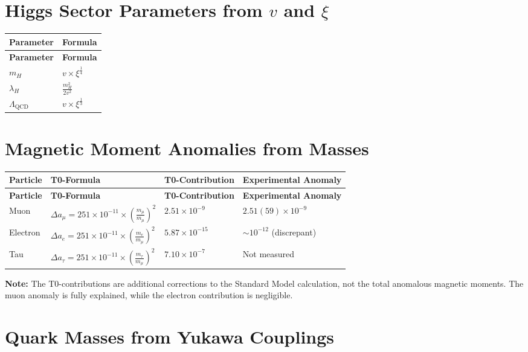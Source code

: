 \documentclass[12pt,a4paper]{article}
\begin{document}
	\section{Higgs Sector Parameters from $v$ and $\xi$}
	\begin{longtable}{|p{5cm}|p{6cm}|}
		\hline
		\textbf{Parameter} & \textbf{Formula} \\
		\hline
		\endfirsthead
		\hline
		\textbf{Parameter} & \textbf{Formula} \\
		\hline
		\endhead
		$m_H$ & $v \times \xi^{\frac{1}{4}}$ \\
		\hline
		$\lambda_H$ & $\frac{m_H^{2}}{2v^{2}}$ \\
		\hline
		$\Lambda_{\text{QCD}}$ & $v \times \xi^{\frac{1}{3}}$ \\
		\hline
	\end{longtable}
	
	\section{Magnetic Moment Anomalies from Masses}
	\begin{longtable}{|p{3cm}|p{5cm}|p{4cm}|p{3cm}|}
		\hline
		\textbf{Particle} & \textbf{T0-Formula} & \textbf{T0-Contribution} & \textbf{Experimental Anomaly} \\
		\hline
		\endfirsthead
		\hline
		\textbf{Particle} & \textbf{T0-Formula} & \textbf{T0-Contribution} & \textbf{Experimental Anomaly} \\
		\hline
		\endhead
		Muon & $\Delta a_{\mu} = 251 \times 10^{-11} \times \left(\frac{m_{\mu}}{m_{\mu}}\right)^{2}$ & $2.51 \times 10^{-9}$ & $2.51(59) \times 10^{-9}$ \\
		\hline
		Electron & $\Delta a_{e} = 251 \times 10^{-11} \times \left(\frac{m_{e}}{m_{\mu}}\right)^{2}$ & $5.87 \times 10^{-15}$ & $\sim 10^{-12}$ (discrepant) \\
		\hline
		Tau & $\Delta a_{\tau} = 251 \times 10^{-11} \times \left(\frac{m_{\tau}}{m_{\mu}}\right)^{2}$ & $7.10 \times 10^{-7}$ & Not measured \\
		\hline
	\end{longtable}
	
	\textbf{Note:} The T0-contributions are additional corrections to the Standard Model calculation, not the total anomalous magnetic moments. The muon anomaly is fully explained, while the electron contribution is negligible.
	

	\section{Quark Masses from Yukawa Couplings}
\end{document}
